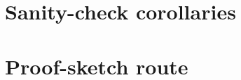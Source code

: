\documentclass[11pt]{article}
\theoremstyle{definition}
\theoremstyle{plain}
\theoremstyle{remark}
\begin{document}
\section{Sanity-check corollaries}

\section{Proof-sketch route}
\end{document}
